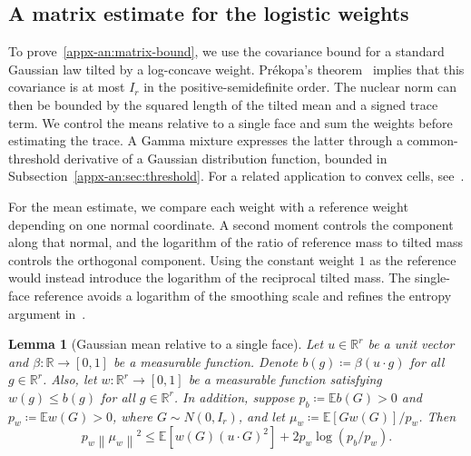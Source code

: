 \documentclass[11pt,letterpaper]{article}
\newtheorem{lemma}{Lemma}
\theoremstyle{remark}
\newcommand{\E}{\mathbb E}
\newcommand{\R}{\mathbb R}
\newcommand{\norm}[1]{\left\lVert#1\right\rVert}
\begin{document}
\subsection{A matrix estimate for the logistic weights}
\label{appx-an:sec:matrix}

To prove~\eqref{appx-an:matrix-bound}, we use the covariance bound for
a standard Gaussian law tilted by a log-concave weight. Pr\'ekopa's
theorem~\cite[Theorem~6]{Prekopa1973} implies that this covariance is
at most \(I_r\) in the positive-semidefinite order. The nuclear norm
can then be bounded by the squared length of the tilted mean and a
signed trace term. We control the means relative to a single face and sum the
weights before estimating the trace. A Gamma mixture expresses the
latter through a common-threshold derivative of a Gaussian distribution
function, bounded in Subsection~\ref{appx-an:sec:threshold}.
For a related application to convex cells,
see~\cite[Lemma~12]{GaoZhang}.

For the mean estimate, we compare each weight with a reference weight
depending on one normal coordinate. A second moment controls the
component along that normal, and the logarithm of the ratio of
reference mass to tilted mass controls the orthogonal component.
Using the constant weight \(1\) as the reference would instead introduce
the logarithm of the reciprocal tilted mass. The single-face reference
avoids a logarithm of the smoothing scale and refines the entropy argument
in~\cite[Lemma~12]{GaoZhang}.

\begin{lemma}[Gaussian mean relative to a single face]
\label{appx-an:lem:mean}
Let \(u\in\R^r\) be a unit vector and
\(\beta:\R\to[0,1]\) be a measurable function. Denote
\(b(g)\coloneqq\beta(u\cdot g)\) for all \(g\in\R^r\).
Also, let \(w:\R^r\to[0,1]\) be a measurable function
satisfying \(w(g)\le b(g)\) for all $g\in\R^r$.
In addition, suppose \(p_b\coloneqq\E b(G)>0\) and
\(p_w\coloneqq\E w(G)>0\), where \(G\sim N(0,I_r)\),
and let \(\mu_w\coloneqq\E[Gw(G)]/p_w\). Then
\begin{equation}
 p_w\norm{\mu_w}^2
 \le \E[w(G)(u\cdot G)^2]
        +2p_w\log(p_b/p_w).
 \label{appx-an:mean-entropy}
\end{equation}
\end{lemma}
\end{document}
